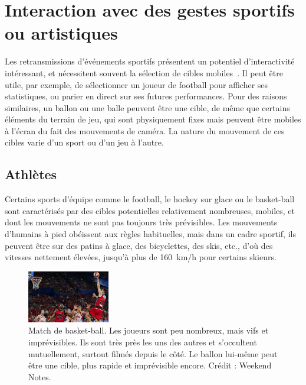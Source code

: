 	\section{Interaction avec des gestes sportifs ou artistiques}	
	Les retransmissions d'événements sportifs présentent un potentiel d'interactivité intéressant, et nécessitent souvent la sélection de cibles mobiles~\cite{ilich2010moving}. Il peut être utile, par exemple, de sélectionner un joueur de football pour afficher ses statistiques, ou parier en direct sur ses futures performances. Pour des raisons similaires, un ballon ou une balle peuvent être une cible, de même que certains éléments du terrain de jeu, qui sont physiquement fixes mais peuvent être mobiles à l'écran du fait des mouvements de caméra. La nature du mouvement de ces cibles varie d'un sport ou d'un jeu à l'autre.
	
	\subsection{Athlètes}
	
	Certains sports d'équipe comme le football, le hockey sur glace ou le basket-ball sont caractérisés par des cibles potentielles relativement nombreuses, mobiles, et dont les mouvements ne sont pas toujours très prévisibles. Les mouvements d'humains à pied obéissent aux règles habituelles, mais dans un cadre sportif, ils peuvent être sur des patins à glace, des bicyclettes, des skis, etc., d'où des vitesses nettement élevées, jusqu'à plus de 160~km/h pour certains skieurs.\footnotemark{}
	
	
	\begin{figure}
		\centering
		\includegraphics[width=0.32\textwidth]{figures/ch1/basket}
		\caption[Match de basket-ball]{Match de basket-ball. Les joueurs sont peu nombreux, mais vifs et imprévisibles. Ils sont très près les uns des autres et s'occultent mutuellement, surtout filmés depuis le côté. Le ballon lui-même peut être une cible, plus rapide et imprévisible encore. Crédit : Weekend Notes.}
		\label{fig:basketball}
	\end{figure}
	
